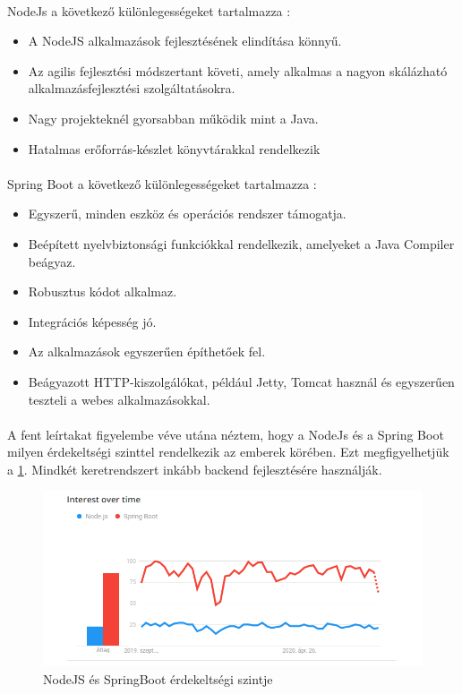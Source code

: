 	\paragraph{}
	NodeJs a következő különlegességeket tartalmazza \cite{nodejsspring}:
	\begin{itemize}
		\item A NodeJS alkalmazások fejlesztésének elindítása könnyű.
		\item Az agilis fejlesztési módszertant követi, amely alkalmas a nagyon skálázható alkalmazásfejlesztési szolgáltatásokra.
		\item Nagy projekteknél gyorsabban működik mint a Java.
		\item Hatalmas erőforrás-készlet könyvtárakkal rendelkezik
	\end{itemize}
	
	\paragraph{}
	Spring Boot a következő különlegességeket tartalmazza \cite{nodejsspring}:
	\begin{itemize}
		\item Egyszerű, minden eszköz és operációs rendszer támogatja.
		\item Beépített nyelvbiztonsági funkciókkal rendelkezik, amelyeket a Java Compiler beágyaz.
		\item Robusztus kódot alkalmaz.
		\item Integrációs képesség jó.
		\item Az alkalmazások egyszerűen építhetőek fel.
		\item Beágyazott HTTP-kiszolgálókat, például Jetty, Tomcat használ és egyszerűen teszteli a webes alkalmazásokkal.
	\end{itemize}
	
	\paragraph{}
	A fent leírtakat figyelembe véve utána néztem, hogy a NodeJs és a Spring Boot milyen érdekeltségi szinttel rendelkezik az emberek körében. Ezt megfigyelhetjük a  \ref{nodespring}. \cite{nodejsspring1} Mindkét keretrendszert inkább backend fejlesztésére használják.
	
	\begin{figure}
		\centering
		\includegraphics[scale=0.9]{figures/images/nodespring.png}
		\caption{NodeJS és SpringBoot érdekeltségi szintje}
		\label{nodespring}
	\end{figure}
